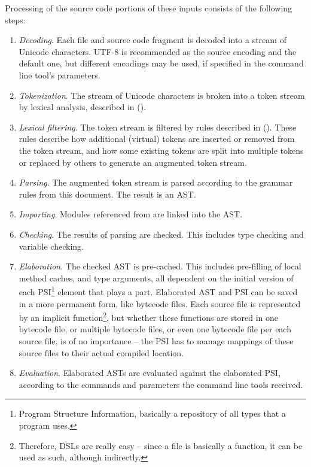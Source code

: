 Processing of the source code portions of these inputs consists of the following steps: 
\begin{enumerate}
  \item {\em Decoding}. Each file and source code fragment is decoded into a stream of Unicode characters. UTF-8 is recommended as the source encoding and the default one, but different encodings may be used, if specified in the command line tool's parameters. 
  \item {\em Tokenization}. The stream of Unicode characters is broken into a token stream by lexical analysis, described in ().
  \item {\em Lexical filtering}. The token stream is filtered by rules described in (). These rules describe how additional (virtual) tokens are inserted or removed from the token stream, and how some existing tokens are split into multiple tokens or replaced by others to generate an augmented token stream. 
  \item {\em Parsing}. The augmented token stream is parsed according to the grammar rules from this document. The result is an AST. 
  \item {\em Importing}. Modules referenced from  are linked into the AST. 
  \item {\em Checking}. The results of parsing are checked. This includes type checking and variable checking. 
  \item {\em Elaboration}. The checked AST is pre-cached. This includes pre-filling of local method caches, and type arguments, all dependent on the initial version of each PSI\footnote{Program Structure Information, basically a repository of all types that a program uses.} element that plays a part. Elaborated AST and PSI can be saved in a more permanent form, like bytecode files. Each source file is represented by an implicit function\footnote{Therefore, DSLs are really easy -- since a file is basically a function, it can be used as such, although indirectly.}, but whether these functions are stored in one bytecode file, or multiple bytecode files, or even one bytecode file per each source file, is of no importance -- the PSI has to manage mappings of these source files to their actual compiled location. 
  \item {\em Evaluation}. Elaborated ASTs are evaluated against the elaborated PSI, according to the commands and parameters the command line tools received. 
\end{enumerate}







